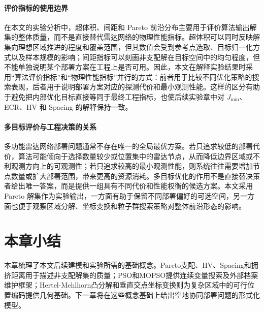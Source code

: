 \paragraph{评价指标的使用边界}
在本文的实验分析中，超体积、间距和 Pareto 前沿分布主要用于评价算法输出解集的整体质量，而不是直接替代雷达网络的物理性能指标。超体积可以同时反映解集向理想区域推进的程度和覆盖范围，但其数值会受到参考点选取、目标归一化方式以及样本规模的影响；间距指标可以刻画非支配解在目标空间中的均匀程度，但不能单独说明某个部署方案在工程上是否可用。因此，本文在解释实验结果时采用“算法评价指标”和“物理性能指标”并行的方式：前者用于比较不同优化策略的搜索表现，后者用于说明部署方案对应的探测代价和最小观测性能。这样的区分有助于避免把内部优化目标直接等同于最终工程指标，也使后续实验章中对 $J_{\min}$、ECR、HV 和 Spacing 的解释保持一致。

\paragraph{多目标评价与工程决策的关系}
多功能雷达网络部署问题通常不存在唯一的全局最优方案。若只追求较低的部署代价，算法可能倾向于选择数量较少或位置集中的雷达节点，从而降低边界区域或不利观测方向上的可观测性；若只追求较高的最小观测性能，则系统往往需要增加节点数量或扩大部署范围，带来更高的资源消耗。多目标优化的作用不是直接替决策者给出唯一答案，而是提供一组具有不同代价和性能权衡的候选方案。本文采用 Pareto 解集作为实验输出，一方面有助于保留不同部署偏好的可选空间，另一方面也便于观察区域分解、坐标变换和粒子群搜索策略对整体前沿形态的影响。

\section{本章小结}

本章梳理了本文后续建模和实验所需的基础概念。Pareto支配、HV、Spacing和拥挤距离用于描述非支配解集的质量；PSO和MOPSO提供连续变量搜索及外部档案维护框架；Hertel-Mehlhorn凸分解和垂直交点坐标变换则为复杂区域中的可行位置编码提供几何基础。下一章将在这些概念基础上给出空地协同部署问题的形式化模型。
